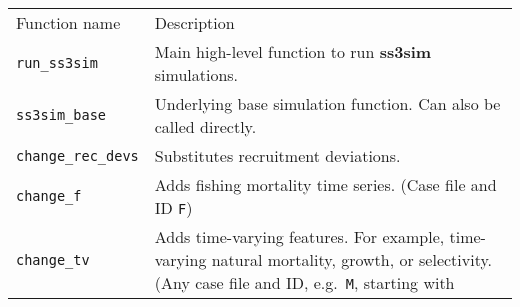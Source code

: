 \begin{longtable}[c]{@{}ll@{}}
\hline\noalign{\medskip}
\begin{minipage}[b]{0.32\columnwidth}\raggedright
Function name
\end{minipage} & \begin{minipage}[b]{0.57\columnwidth}\raggedright
Description
\end{minipage}
\\\noalign{\medskip}
\hline\noalign{\medskip}
\begin{minipage}[t]{0.32\columnwidth}\raggedright
\texttt{run\_ss3sim}
\end{minipage} & \begin{minipage}[t]{0.57\columnwidth}\raggedright
Main high-level function to run \textbf{ss3sim} simulations.
\end{minipage}
\\\noalign{\medskip}
\begin{minipage}[t]{0.32\columnwidth}\raggedright
\texttt{ss3sim\_base}
\end{minipage} & \begin{minipage}[t]{0.57\columnwidth}\raggedright
Underlying base simulation function. Can also be called directly.
\end{minipage}
\\\noalign{\medskip}
\begin{minipage}[t]{0.32\columnwidth}\raggedright
\texttt{change\_rec\_devs}
\end{minipage} & \begin{minipage}[t]{0.57\columnwidth}\raggedright
Substitutes recruitment deviations.
\end{minipage}
\\\noalign{\medskip}
\begin{minipage}[t]{0.32\columnwidth}\raggedright
\texttt{change\_f}
\end{minipage} & \begin{minipage}[t]{0.57\columnwidth}\raggedright
Adds fishing mortality time series. (Case file and ID \texttt{F})
\end{minipage}
\\\noalign{\medskip}
\begin{minipage}[t]{0.32\columnwidth}\raggedright
\texttt{change\_tv}
\end{minipage} & \begin{minipage}[t]{0.57\columnwidth}\raggedright
Adds time-varying features. For example, time-varying natural mortality,
growth, or selectivity. (Any case file and ID, e.g.~\texttt{M}, starting with

\end{minipage}
\end{longtable}
